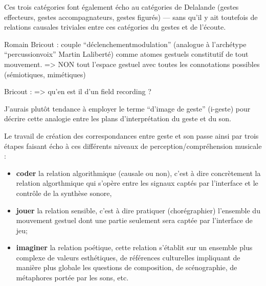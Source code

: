 Ces trois catégories font également écho au catégories de Delalande (gestes effecteurs, gestes accompagnateurs, gestes figurés) — sans qu'il y ait toutefois de relations causales triviales entre ces catégories du gestes et de l'écoute.

Romain Bricout : couple ``déclenchement\/modulation'' (analogue à l'archétype ``percussion\/voix'' Martin Laliberté) comme atomes gestuels constitutif de tout mouvement. => NON tout l'espace gestuel avec toutes les connotations possibles (sémiotiques, mimétiques)

Bricout :
=> qu'en est il d'un field recording ?


J'aurais plutôt tendance à employer le terme ``d'image de geste'' (i-geste) pour décrire cette analogie entre les plans d'interprétation du geste et du son.

Le travail de création des correspondances entre geste et son passe ainsi par trois étapes faisant écho à ces différents niveaux de perception/compréhension musicale :
\vspace{-1em}
\begin{itemize}[noitemsep]
\item \textbf{coder} la relation algorithmique (causale ou non), c'est à dire concrètement la relation algorthmique qui s'opère entre les signaux captés par l'interface et le contrôle de la synthèse sonore, 
\item\textbf{jouer} la relation sensible, c'est à dire pratiquer (chorégraphier) l'ensemble du mouvement gestuel dont une partie seulement sera captée par l'interface de jeu;
\item\textbf{imaginer} la relation poétique, cette relation s'établit sur un ensemble plus complexe de valeurs esthétiques, de références culturelles impliquant de manière plus globale les questions de composition, de scénographie, de métaphores portée par les sons, etc.
\end{itemize}



